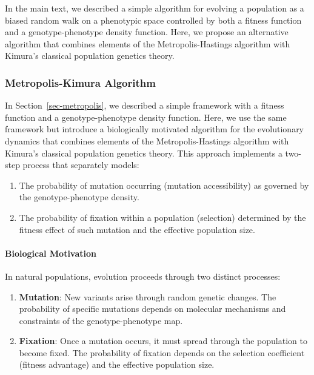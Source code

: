 \documentclass[
]{scrartcl}
\let\oldparagraph\paragraph
\renewcommand{\paragraph}[1]{\oldparagraph{#1}\mbox{}}
\providecommand{\tightlist}{%
  \setlength{\itemsep}{0pt}\setlength{\parskip}{0pt}}
\begin{document}
\begin{refsection}
In the main text, we described a simple algorithm for evolving a
population as a biased random walk on a phenotypic space controlled by
both a fitness function and a genotype-phenotype density function. Here,
we propose an alternative algorithm that combines elements of the
Metropolis-Hastings algorithm with Kimura's classical population
genetics theory.

\subsubsection{Metropolis-Kimura
Algorithm}\label{metropolis-kimura-algorithm}

In Section~\ref{sec-metropolis}, we described a simple framework with a
fitness function and a genotype-phenotype density function. Here, we use
the same framework but introduce a biologically motivated algorithm for
the evolutionary dynamics that combines elements of the
Metropolis-Hastings algorithm with Kimura's classical population
genetics theory. This approach implements a two-step process that
separately models:

\begin{enumerate}
\def\labelenumi{\arabic{enumi}.}
\tightlist
\item
  The probability of mutation occurring (mutation accessibility) as
  governed by the genotype-phenotype density.
\item
  The probability of fixation within a population (selection) determined
  by the fitness effect of such mutation and the effective population
  size.
\end{enumerate}

\paragraph{Biological Motivation}\label{biological-motivation}

In natural populations, evolution proceeds through two distinct
processes:

\begin{enumerate}
\def\labelenumi{\arabic{enumi}.}
\item
  \textbf{Mutation}: New variants arise through random genetic changes.
  The probability of specific mutations depends on molecular mechanisms
  and constraints of the genotype-phenotype map.
\item
  \textbf{Fixation}: Once a mutation occurs, it must spread through the
  population to become fixed. The probability of fixation depends on the
  selection coefficient (fitness advantage) and the effective population
  size.
\end{enumerate}


\end{refsection}
\end{document}
